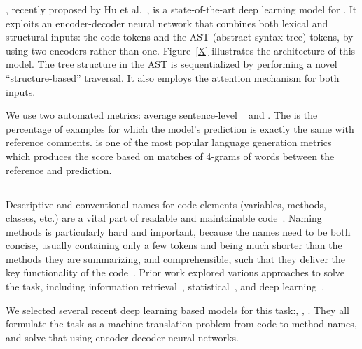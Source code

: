 , recently proposed by Hu et
al.~\cite{HuETAL19Deep}, is a state-of-the-art deep learning model for
\comgen.  It exploits an encoder-decoder neural network that combines
both lexical and structural inputs: the code tokens and the AST
(abstract syntax tree) tokens, by using two encoders rather than one.
Figure~\ref{X} illustrates the architecture of this model.  The tree
structure in the AST is sequentialized by performing a novel
``structure-based'' traversal.  It also employs the attention
mechanism for both inputs.

 We use two automated metrics: average
sentence-level ~\cite{XXX} and \xmatch. The \xmatch is the
percentage of examples for which the model's prediction is exactly the
same with reference comments.  \bleu is one of the most popular
language generation metrics which produces the score based on matches
of 4-grams of words between the reference and prediction.


\subsection{\MethNam}
\label{sec:tasks:methnam}

 Descriptive and conventional names for code
elements (variables, methods, classes, etc.) are a vital part of
readable and maintainable code~\cite{XXX}.  Naming methods is
particularly hard and important, because the names need to be both
concise, usually containing only a few tokens and being much shorter
than the methods they are summarizing, and comprehensible, such that
they deliver the key functionality of the
code~\cite{LawrieETAL06Whats}.  Prior work explored various approaches
to solve the task, including information retrieval~\cite{XXX},
statistical~\cite{XXX}, and deep
learning~\cite{AllamanisETAL16Convolutional, XuETAL19Method,
  YonaiETAL19Mercem, AlonETAL19Code2vec, AlonETAL19code2seq,
  NguyenETAL20Suggesting}.

 We selected several recent deep learning based models
for this task:, ,
.  They all formulate the task as a machine
translation problem from code to method names, and solve that using encoder-decoder neural
networks.

